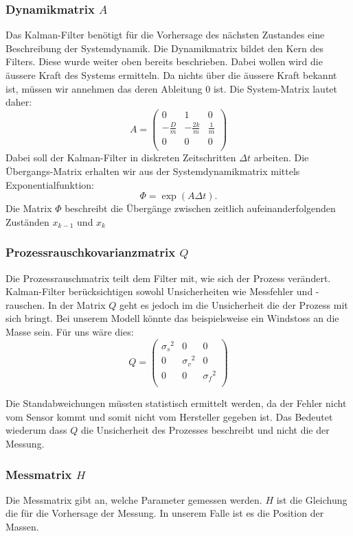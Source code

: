\subsubsection*{Dynamikmatrix $A$}
Das Kalman-Filter benötigt für die Vorhersage des nächsten Zustandes eine Beschreibung der Systemdynamik.
Die Dynamikmatrix bildet den Kern des Filters. Diese wurde weiter oben bereits beschrieben. 
Dabei wollen wird die äussere Kraft des Systems ermitteln.
Da nichts über die äussere Kraft bekannt ist, müssen wir annehmen das deren Ableitung 0 ist. 
Die System-Matrix lautet daher:
\[ 
A = \left(
 \begin{array}{ccc} 	
0 & 1& 0 \\
- \frac{D}{m} &-\frac{2k}{m} & \frac{1} {m}\\
0 & 0& 0\\ 
\end{array}\right)  
 \]
Dabei soll der Kalman-Filter in diskreten Zeitschritten $\Delta t$ arbeiten. 
Die Übergangs-Matrix erhalten wir aus der Systemdynamikmatrix mittels Exponentialfunktion: 
\[\Phi = \exp(A\Delta t). \]
Die Matrix $\Phi$ beschreibt die Übergänge zwischen zeitlich aufeinanderfolgenden Zuständen $x_{k-1}$ und $x_{k}$

\subsubsection*{Prozessrauschkovarianzmatrix $Q$}
Die Prozessrauschmatrix teilt dem Filter mit, wie sich der Prozess verändert. 
Kalman-Filter berücksichtigen sowohl Unsicherheiten wie Messfehler und -rauschen. 
In der Matrix $Q$ geht es jedoch im die Unsicherheit die der Prozess mit sich bringt. 
Bei unserem Modell könnte das beispielsweise ein Windstoss an die Masse sein. 
Für uns wäre dies:
\[ 
Q = \left(
 \begin{array}{ccc} 	
{\sigma_s }^2& 0& 0 \\ 
0 & {\sigma_v }^2& 0\\ 
0 & 0& {\sigma_f }^2\\
\end{array}\right)  
 \]

Die Standabweichungen müssten statistisch ermittelt werden, da der Fehler nicht vom Sensor kommt und somit nicht vom Hersteller gegeben ist. 
Das Bedeutet wiederum dass $Q$ die Unsicherheit des Prozesses beschreibt und nicht die der Messung.

\subsubsection*{Messmatrix $H$}
Die Messmatrix gibt an, welche Parameter gemessen werden. 
$H$ ist die Gleichung die für die Vorhersage der Messung.
In unserem Falle ist es die Position der Massen. 


